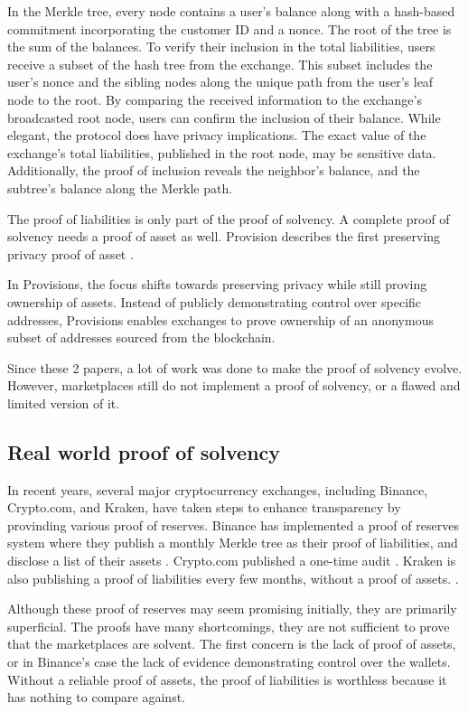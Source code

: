 In the Merkle tree, every node contains a user's balance along with a hash-based commitment incorporating the customer ID and a nonce. The root of the tree is the sum of the balances.
To verify their inclusion in the total liabilities, users receive a subset of the hash tree from the exchange. This subset includes the user's nonce and the sibling nodes along the unique path from the user's leaf node to the root.
By comparing the received information to the exchange's broadcasted root node, users can confirm the inclusion of their balance.
While elegant, the protocol does have privacy implications. The exact value of the exchange's total liabilities, published in the root node, may be sensitive data.
Additionally, the proof of inclusion reveals the neighbor's balance, and the subtree's balance along the Merkle path.


The proof of liabilities is only part of the proof of solvency. A complete proof of solvency needs a proof of asset as well.
Provision describes the first preserving privacy proof of asset \cite{DBBBCC15}.


In Provisions, the focus shifts towards preserving privacy while still proving ownership of assets.
Instead of publicly demonstrating control over specific addresses, Provisions enables exchanges to prove ownership of an anonymous subset of addresses sourced from the blockchain.


Since these 2 papers, a lot of work was done to make the proof of solvency evolve. However, marketplaces still do not implement a proof of solvency, or a flawed and limited version of it.




\subsection{Real world proof of solvency}
In recent years, several major cryptocurrency exchanges, including Binance, Crypto.com, and Kraken, have taken steps to enhance transparency by provinding various proof of reserves.
Binance has implemented a proof of reserves system where they publish a monthly Merkle tree as their proof of liabilities, and disclose a list of their assets \cite{BPR}.
Crypto.com published a one-time audit \cite{CC22}.
Kraken is also publishing a proof of liabilities every few months, without a proof of assets. \cite{KK23}.


Although these proof of reserves may seem promising initially, they are primarily superficial.
The proofs have many shortcomings, they are not sufficient to prove that the marketplaces are solvent.
The first concern is the lack of proof of assets, or in Binance's case the lack of evidence demonstrating control over the wallets.
Without a reliable proof of assets, the proof of liabilities is worthless because it has nothing to compare against.


